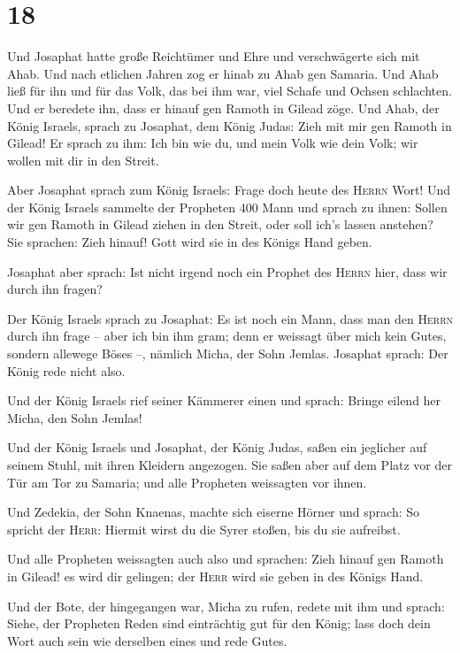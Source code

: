 \hypertarget{section-17}{%
\section{18}\label{section-17}}

 Und Josaphat hatte große Reichtümer und Ehre und
verschwägerte sich mit Ahab.  Und nach etlichen Jahren zog
er hinab zu Ahab gen Samaria. Und Ahab ließ für ihn und für das Volk,
das bei ihm war, viel Schafe und Ochsen schlachten. Und er beredete ihn,
dass er hinauf gen Ramoth in Gilead zöge.  Und Ahab, der
König Israels, sprach zu Josaphat, dem König Judas: Zieh mit mir gen
Ramoth in Gilead! Er sprach zu ihm: Ich bin wie du, und mein Volk wie
dein Volk; wir wollen mit dir in den Streit.

 Aber Josaphat sprach zum König Israels: Frage doch heute
des \textsc{Herrn} Wort!  Und der König Israels sammelte
der Propheten 400 Mann und sprach zu ihnen: Sollen wir gen Ramoth in
Gilead ziehen in den Streit, oder soll ich's lassen anstehen? Sie
sprachen: Zieh hinauf! Gott wird sie in des Königs Hand geben.

 Josaphat aber sprach: Ist nicht irgend noch ein Prophet
des \textsc{Herrn} hier, dass wir durch ihn fragen?

 Der König Israels sprach zu Josaphat: Es ist noch ein
Mann, dass man den \textsc{Herrn} durch ihn frage -- aber ich bin ihm
gram; denn er weissagt über mich kein Gutes, sondern allewege Böses --,
nämlich Micha, der Sohn Jemlas. Josaphat sprach: Der König rede nicht
also.

 Und der König Israels rief seiner Kämmerer einen und
sprach: Bringe eilend her Micha, den Sohn Jemlas!

 Und der König Israels und Josaphat, der König Judas,
saßen ein jeglicher auf seinem Stuhl, mit ihren Kleidern angezogen. Sie
saßen aber auf dem Platz vor der Tür am Tor zu Samaria; und alle
Propheten weissagten vor ihnen.

 Und Zedekia, der Sohn Knaenas, machte sich eiserne
Hörner und sprach: So spricht der \textsc{Herr}: Hiermit wirst du die
Syrer stoßen, bis du sie aufreibst.

 Und alle Propheten weissagten auch also und sprachen:
Zieh hinauf gen Ramoth in Gilead! es wird dir gelingen; der
\textsc{Herr} wird sie geben in des Königs Hand.

 Und der Bote, der hingegangen war, Micha zu rufen,
redete mit ihm und sprach: Siehe, der Propheten Reden sind einträchtig
gut für den König; lass doch dein Wort auch sein wie derselben eines und
rede Gutes.

